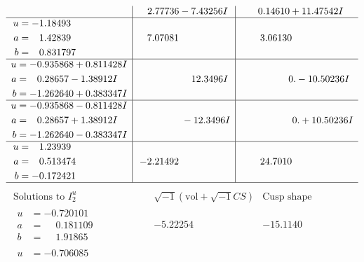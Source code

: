 \documentclass[1p]{elsarticle_modified}
\theoremstyle{definition}
\newcommand{\I}{\sqrt{-1}}
\begin{document}
$$\begin{array}{c|c|c}
 & \phantom{-}2.77736 - 7.43256 I & \phantom{-}0.14610 + 11.47542 I \\ \hline\begin{aligned}
u &= -1.18493\phantom{ +0.000000I} \\
a &= \phantom{-}1.42839\phantom{ +0.000000I} \\
b &= \phantom{-}0.831797\phantom{ +0.000000I}\end{aligned}
 & \phantom{-}7.07081\phantom{ +0.000000I} & \phantom{-}3.06130\phantom{ +0.000000I} \\ \hline\begin{aligned}
u &= -0.935868 + 0.811428 I \\
a &= \phantom{-}0.28657 - 1.38912 I \\
b &= -1.262640 + 0.383347 I\end{aligned}
 & \phantom{-0.000000 -}12.3496 I & \phantom{-0.000000 } 0. - 10.50236 I \\ \hline\begin{aligned}
u &= -0.935868 - 0.811428 I \\
a &= \phantom{-}0.28657 + 1.38912 I \\
b &= -1.262640 - 0.383347 I\end{aligned}
 & \phantom{-0.000000 } -12.3496 I & \phantom{-0.000000 -}0. + 10.50236 I \\ \hline\begin{aligned}
u &= \phantom{-}1.23939\phantom{ +0.000000I} \\
a &= \phantom{-}0.513474\phantom{ +0.000000I} \\
b &= -0.172421\phantom{ +0.000000I}\end{aligned}
 & -2.21492\phantom{ +0.000000I} & \phantom{-}24.7010\phantom{ +0.000000I}\\
 \hline 
 \end{array}$$\newpage$$\begin{array}{c|c|c}  
\text{Solutions to }I^u_{2}& \I (\text{vol} + \sqrt{-1}CS) & \text{Cusp shape}\\
 \hline 
\begin{aligned}
u &= -0.720101\phantom{ +0.000000I} \\
a &= \phantom{-}0.181109\phantom{ +0.000000I} \\
b &= \phantom{-}1.91865\phantom{ +0.000000I}\end{aligned}
 & -5.22254\phantom{ +0.000000I} & -15.1140\phantom{ +0.000000I} \\ \hline\begin{aligned}
u &= -0.706085\phantom{ +0.000000I} \\

\end{aligned}
\end{array}$$
\end{document}
